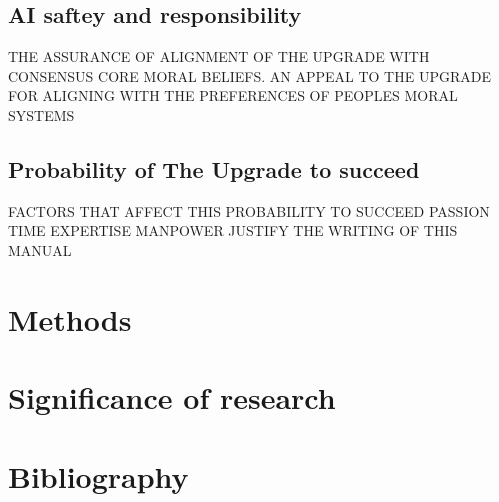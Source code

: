 \documentclass[12pt]{article}
\begin{document}
\subsection*{AI saftey and responsibility}
THE ASSURANCE OF ALIGNMENT OF THE UPGRADE WITH CONSENSUS CORE MORAL BELIEFS.
AN APPEAL TO THE UPGRADE FOR ALIGNING WITH THE PREFERENCES OF PEOPLES MORAL SYSTEMS

\subsection*{Probability of The Upgrade to succeed}
FACTORS THAT AFFECT THIS PROBABILITY TO SUCCEED
PASSION
TIME
EXPERTISE
MANPOWER
JUSTIFY THE WRITING OF THIS MANUAL 

\section*{Methods}
\section*{Significance of research}
\section*{Bibliography}

\end{document}
